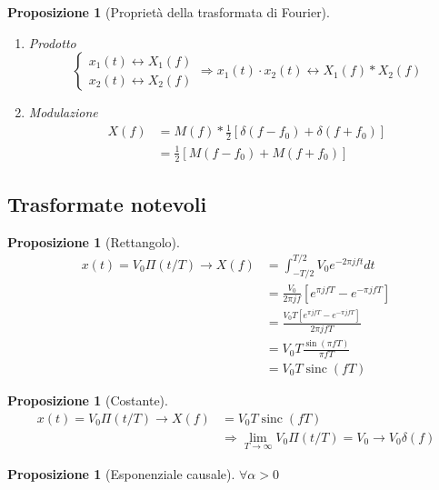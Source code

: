 \documentclass[a4paper,10pt]{article}
\theoremstyle{mystyle}
\newtheorem{proposition}[theorem]{Proposizione}
\begin{document}
\begin{multicols}{2}
\begin{proposition}[Proprietà della trasformata di Fourier]
\begin{enumerate}[label=\roman*.]
        \item Prodotto
            \[
                \begin{cases}
                    x_1 (t) \leftrightarrow X_1(f) \\
                    x_2 (t) \leftrightarrow X_2(f)
                \end{cases}
                \Rightarrow x_1 (t) \cdot x_2 (t) \leftrightarrow X_1(f)*X_2(f)
            \]
        \item Modulazione
        \begin{align*}
            X(f) &= 
            M(f) * \frac{1}{2} \left[ \delta(f-f_0) + \delta(f+f_0) \right] \\
            &= \frac{1}{2} \left[ M(f-f_0) + M(f+f_0) \right]
        \end{align*}
    \end{enumerate}
\end{proposition}

\subsection{Trasformate notevoli}

\begin{proposition}[Rettangolo]
    \begin{align*}
        x(t) = V_0 \Pi (t/T) \rightarrow X(f)
        &= \int_{-T/2}^{T/2} V_0 e^{-2 \pi j f t} dt \\
        &= \frac{V_0}{2 \pi j f} [e^{\pi jfT}-e^{-\pi jfT}] \\
        &= \frac{V_0 T [e^{\pi jfT}-e^{-\pi jfT}]}{2\pi jfT} \\
        &= V_0 T \frac{\sin(\pi fT)}{\pi f T}\\
        &= V_0 T \operatorname{sinc}(fT)
    \end{align*}
\end{proposition}

\begin{proposition}[Costante]
    \begin{align*}
        x(t) = V_0 \Pi (t/T) \rightarrow X(f)
        &= V_0 T \operatorname{sinc} (fT) \\
        &\Rightarrow \lim_{T \rightarrow \infty} V_0 \Pi (t/T) =V_0 \rightarrow V_0 \delta (f)
    \end{align*}
\end{proposition}

\begin{proposition}[Esponenziale causale]
    \(\forall \alpha >0\)


\end{proposition}
\end{multicols}
\end{document}
